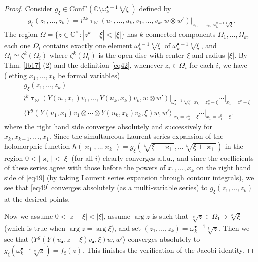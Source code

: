 \documentclass[12pt,a4paper,notitlepage]{article}
\theoremstyle{definition}
\theoremstyle{plain}
\newcommand{\Conf}{\mathrm{Conf}}
\newcommand{\bk}[1]{\langle {#1}\rangle}
\newcommand{\blt}{\bullet}
\newcommand{\Wbb}{\mathbb W}
\newcommand{\Cbb}{\mathbb C}
\numberwithin{equation}{section}
\begin{document}
\begin{proof}
Consider $g_\xi\in\Conf^n(\Cbb\setminus\omega_k^{\blt-1}\sqrt[k]{\xi})$ defined by
\begin{align*}
g_\xi(z_1,\dots,z_k)=\wr^{2k}\uptau_\Wbb(u_1,\dots,u_k,v_1,\dots,v_k,w\otimes w')\Big|_{z_1,\dots,z_k,~\omega_k^{\blt-1}\sqrt[k]{\xi}}.	
\end{align*}
The region $\Omega=\{z\in\Cbb^\times:|z^k-\xi|<|\xi|\}$ has $k$ connected components $\Omega_1,\dots,\Omega_k$, each one $\Omega_i$ contains exactly one element $\omega_k^{i-1}\sqrt[k]{\xi}$ of $\omega_k^{\blt-1}\sqrt[k]{\xi}$, and $\Omega_i\simeq\zeta^k(\Omega_i)$ where $\zeta^k(\Omega_i)$ is the open disc with center $\xi$ and radius $|\xi|$. By Thm. \ref{lb17}-(2) and the definition \eqref{eq42}, whenever $z_i\in\Omega_i$ for each $i$, we have  (letting $x_1,\dots,x_k$ be formal variables)
\begin{align}
&g_\xi(z_1,\dots,z_k)\nonumber\\
=&\wr^k\uptau_\Wbb(Y(u_1,x_1)v_1,\dots,Y(u_k,x_k)v_k,w\otimes w')\Big|_{\omega_k^{\blt-1}\sqrt[k]{\xi}}\Big|_{x_k=z_k^k-\xi}\cdots \Big|_{x_1=z_1^k-\xi}\nonumber\\
=&\bk{Y^g(Y(u_1,x_1)v_1\otimes\cdots\otimes Y(u_k,x_k)v_k,\xi)w,w'}\Big|_{x_k=z_k^k-\xi}\cdots \Big|_{x_1=z_1^k-\xi}.\label{eq49}
\end{align}
where the right hand side converges absolutely and successively for $x_k,x_{k-1},\dots,x_1$. Since the simultaneous Laurent series expansion of the holomorphic function $h(\varkappa_1,\dots\varkappa_k)=g_\xi(\sqrt[k]{\xi+\varkappa_1},\dots \sqrt[k]{\xi+\varkappa_1})$ in the region $0<|\varkappa_i|<|\xi|$ (for all $i$) clearly converges a.l.u., and since the coefficients of these series agree with those before the powers of $x_1,\dots,x_k$ on the right hand side of \eqref{eq49} (by taking Laurent series expansion through contour integrals), we see that \eqref{eq49} converges absolutely (as a multi-variable series) to $g_\xi(z_1,\dots,z_k)$  at the desired points. 

Now we  assume $0<|z-\xi|<|\xi|$, assume  $\arg z$ is such that $\sqrt[k]{z}\in\Omega_1\ni\sqrt[k]{\xi}$ (which is true when $\arg z=\arg \xi$), and  set $(z_1,\dots,z_k)=\omega_k^{\blt-1}\sqrt[k]{z}$. Then we see that $\bk{Y^g(Y(u_\blt,z-\xi)v_\blt,\xi)w,w'}$ converges absolutely to $g_\xi(\omega_k^{\blt-s}\sqrt[k]{z})=f_\xi(z)$. This finishes the verification of the Jacobi identity.
\end{proof}
\end{document}
